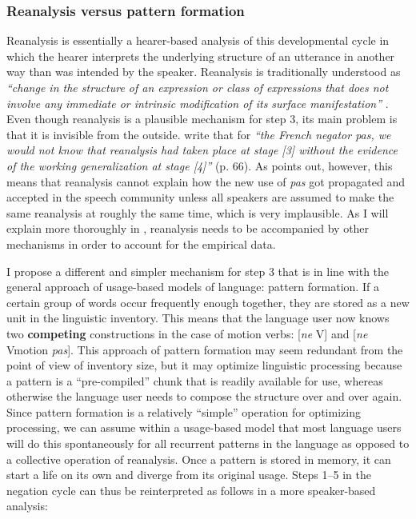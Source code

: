 \subsubsection{Reanalysis versus pattern formation}
 Reanalysis is essentially a hearer-based analysis of this developmental cycle in which the hearer interprets the underlying structure of an utterance in another way than was intended by the speaker. Reanalysis is traditionally understood as {\em ``change in the structure of an expression or class of expressions that does not involve any immediate or intrinsic modification of its surface manifestation''} \citep[58]{langacker77syntactic}. Even though reanalysis is a plausible mechanism for step 3, its main problem is that it is invisible from the outside. \citet{hopper93grammaticalization} write that for {\em ``the French negator {\em pas}, we would not know that reanalysis had taken place at stage [3] without the evidence of the working generalization at stage [4]''} (p. 66). As \citet{haspelmath98does} points out, however, this means that reanalysis cannot explain how the new use of {\em pas} got propagated and accepted in the speech community unless all speakers are assumed to make the same reanalysis at roughly the same time, which is very implausible. As I will explain more thoroughly in , reanalysis needs to be accompanied by other mechanisms in order to account for the empirical data.

I propose a different and simpler mechanism for step 3 that is in line with the general approach of usage-based models of language: pattern formation. If a certain group of words occur frequently enough together, they are stored as a new unit in the linguistic inventory. This means that the language user now knows two {\bfseries competing} constructions in the case of motion verbs: [{\em ne} V] and [{\em ne} Vmotion {\em pas}]. This approach of pattern formation may seem redundant from the point of view of inventory size, but it may optimize linguistic processing because a pattern is a ``pre-compiled'' chunk that is readily available for use, whereas otherwise the language user needs to compose the structure over and over again. Since pattern formation is a relatively ``simple'' operation for optimizing processing, we can assume within a usage-based model that most language users will do this spontaneously for all recurrent patterns in the language as opposed to a collective operation of reanalysis. Once a pattern is stored in memory, it can start a life on its own and diverge from its original usage. Steps 1--5 in the negation cycle can thus be reinterpreted as follows in a more speaker-based analysis:


